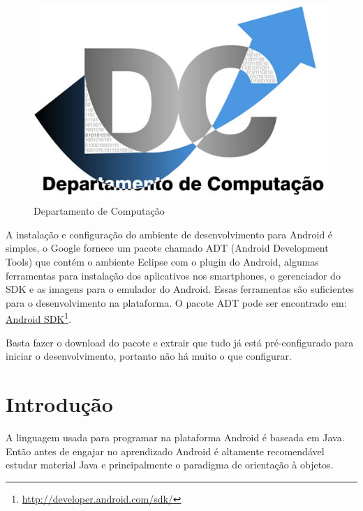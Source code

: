 \documentclass[a4paper,12pt,brazil,doubleside]{book}
\begin{document}
\doublespace

\cleardoublepage

\pagestyle{body}


\begin{figure}[!htb]
  \centering
  \includegraphics[width=.5\textwidth]{../figuras/LogoDC.jpg}
  \caption{Departamento de Computação}
  \label{fig:dc}
\end{figure}



A instalação e configuração do ambiente de desenvolvimento para Android é simples, o Google fornece um pacote chamado ADT (Android Development Tools) que contém o ambiente Eclipse com o plugin do Android, algumas ferramentas para instalação dos aplicativos nos smartphones, o gerenciador do SDK e as imagens para o emulador do Android. Essas ferramentas são suficientes para o desenvolvimento na plataforma.
O pacote ADT pode ser encontrado em: \href{http://developer.android.com/sdk/}{Android SDK}\footnote{\href{http://developer.android.com/sdk/}{http://developer.android.com/sdk/}}. 

Basta fazer o download do pacote e extrair que tudo já está pré-configurado para iniciar o desenvolvimento, portanto não há muito o que configurar.

\section{Introdução}
A linguagem usada para programar na plataforma Android é baseada em Java. Então antes de engajar no aprendizado Android é altamente recomendável estudar material Java e principalmente o paradigma de orientação à objetos.
\end{document}
